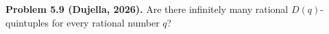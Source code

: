 \textbf{Problem 5.9 (Dujella, 2026).} Are there infinitely many rational $D(q)$-quintuples for every rational number $q$?
